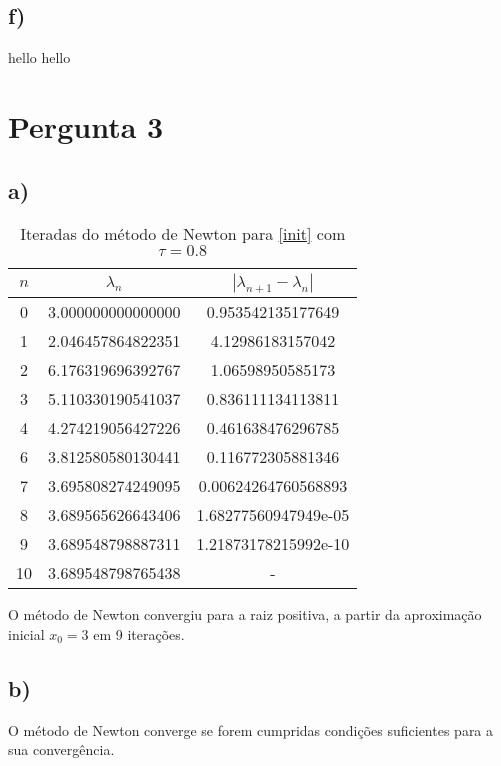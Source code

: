 \documentclass[a4paper, 18pt]{article}
\begin{document}
\subsection*{f)}
	hello hello

\section{Pergunta 3}
\subsection*{a)}
	\begin{table}[H]
		\setlength{\tabcolsep}{0.5cm} %
		\renewcommand{\arraystretch}{1.5} %
		\centering
		\caption{Iteradas do método de Newton para \eqref{init} com $\tau = 0.8$}
		\label{}
		\begin{tabular}{|c|c|c|}
			$n$ & $\lambda _n$ &  $| \lambda _{n+1} - \lambda _n |$ \\\hline
			0 & 3.000000000000000  & 0.953542135177649  \\
			1 & 2.046457864822351  & 4.12986183157042 \\
   			2 & 6.176319696392767  & 1.06598950585173 \\
   			3 & 5.110330190541037  & 0.836111134113811 \\
   			4 & 4.274219056427226  & 0.461638476296785 \\
   			6 & 3.812580580130441  & 0.116772305881346 \\
   			7 & 3.695808274249095  & 0.00624264760568893 \\
   			8 & 3.689565626643406  & 1.68277560947949e-05 \\
   			9 & 3.689548798887311  & 1.21873178215992e-10 \\
   			10 & 3.689548798765438 & - \\
		\end{tabular}
	\end{table}

	\par
	O método de Newton convergiu para a raiz positiva, a partir da aproximação inicial $x_0 = 3$ em 9 iterações.

\subsection*{b)}
	\par
	O método de Newton converge se forem cumpridas condições suficientes para a sua convergência.
\end{document}

